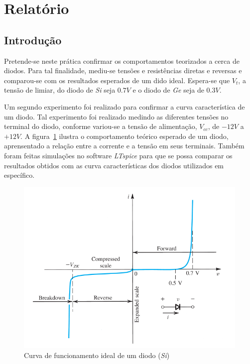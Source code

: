 \documentclass[12pt,a4paper]{article}
\begin{document}
\setcounter{section}{3}
\setcounter{page}{7}
\section{Relatório}
\subsection{Introdução}
Pretende-se neste prática confirmar os comportamentos teorizados a cerca de diodos. Para tal finalidade, mediu-se tensões e resistências diretas e reversas e comparou-se com  os resultados esperados de um dido ideal. Espera-se que $V_t$, a tensão de limiar, do diodo de \emph{Si} seja $0.7 V$ e o diodo de \emph{Ge} seja de $0.3 V$.

Um segundo experimento foi realizado para confirmar a curva característica de um diodo.  Tal experimento foi realizado medindo as diferentes tensões no terminal do diodo, conforme variou-se a tensão de alimentação, $V_{cc}$, de $-12V$ a $+12V$. A figura~\ref{fig:diode_chracteristics} ilustra o comportamento teórico esperado de um diodo, aprensentado a relação entre a corrente e a tensão em seus terminais. Também foram feitas simulações no software \emph{LTspice} para que se possa comparar os resultados obtidos com as curva características dos diodos utilizados em específico. 
\begin{figure}[htpb]
  \centering
  \includegraphics[width=0.8\linewidth]{diode_characteristics.pdf}
  \caption{Curva de funcionamento ideal de um diodo (\emph{Si})}
  \label{fig:diode_chracteristics}
\end{figure}
\end{document}
